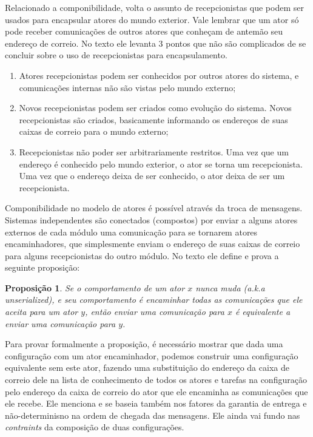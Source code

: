 \documentclass[]{article}
\newtheorem{prop}{Proposição}[section]
\begin{document}
		\par Relacionado a componibilidade, volta o assunto de recepcionistas que podem ser usados para encapsular
		atores do mundo exterior. Vale lembrar que um ator só pode receber comunicações de outros atores que 
		conheçam de antemão seu endereço de correio. No texto ele levanta 3 pontos que não são complicados de se
		concluir sobre o uso de recepcionistas para encapsulamento.
		\begin{enumerate}
			\item Atores recepcionistas podem ser conhecidos por outros atores do sistema, e comunicações internas
			não são vistas pelo mundo externo;
			\item Novos recepcionistas podem ser criados como evolução do sistema. Novos recepcionistas são criados,
			basicamente informando os endereços de suas caixas de correio para o mundo externo;
			\item  Recepcionistas não poder ser arbitrariamente restritos. Uma vez que um endereço é conhecido pelo
			mundo exterior, o ator se torna um recepcionista. Uma vez que o endereço deixa de ser conhecido, o ator
			deixa de ser um recepcionista.
		\end{enumerate}
		
		\par Componibilidade no modelo de atores é possível através da troca de mensagens. Sistemas independentes são
		conectados (compostos) por enviar a alguns atores externos de cada módulo uma comunicação para se tornarem
		atores encaminhadores, que simplesmente enviam o endereço de suas caixas de correio para alguns recepcionistas 
		do outro módulo. No texto ele define e prova a seguinte proposição:
		
		\begin{prop}
			Se o comportamento de um ator $x$ nunca muda (a.k.a unserialized), e seu comportamento é encaminhar
			todas as comunicações que ele aceita para um ator $y$, então enviar uma comunicação para $x$ é 
			equivalente a enviar uma comunicação para $y$.
		\end{prop}
		\par Para provar formalmente a proposição, é necessário mostrar que dada uma configuração com um ator 
		encaminhador, podemos construir uma configuração equivalente sem este ator, fazendo uma substituição
		do endereço da caixa de correio dele na lista de conhecimento de todos os atores e tarefas na configuração
		pelo endereço da caixa de correio do ator que ele encaminha as comunicações que ele recebe. Ele menciona
		e se baseia também nos fatores da garantia de entrega e não-determinisno na ordem de chegada das mensagens.
		Ele ainda vai fundo nas \textit{contraints} da composição de duas configurações.
\newpage


\end{document}
